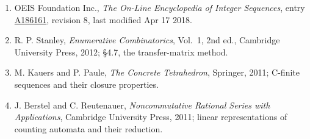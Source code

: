 \documentclass[11pt]{article}
\theoremstyle{definition}
\begin{document}
\begin{enumerate}

\item OEIS Foundation Inc., \emph{The On-Line Encyclopedia of Integer Sequences}, entry \href{https://oeis.org/A186161}{A186161}, revision 8, last modified Apr 17 2018.

\item R. P. Stanley, \emph{Enumerative Combinatorics}, Vol.~1, 2nd ed., Cambridge University Press, 2012; \S4.7, the transfer-matrix method.

\item M. Kauers and P. Paule, \emph{The Concrete Tetrahedron}, Springer, 2011; C-finite sequences and their closure properties.

\item J. Berstel and C. Reutenauer, \emph{Noncommutative Rational Series with Applications}, Cambridge University Press, 2011; linear representations of counting automata and their reduction.

\end{enumerate}
\end{document}
